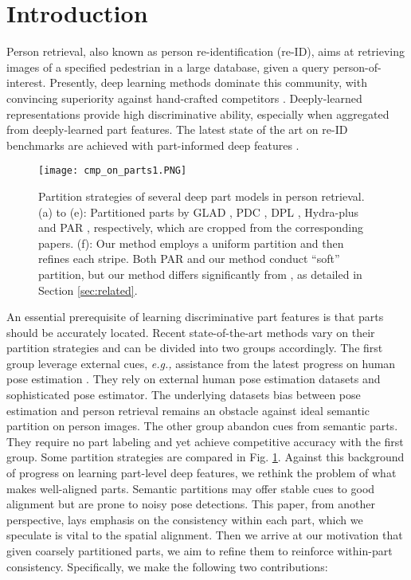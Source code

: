 \documentclass[10pt,twocolumn,letterpaper]{article}
\begin{document}
\section{Introduction}\label{sec:introduction}
Person retrieval, also known as person re-identification (re-ID), aims at retrieving images of a specified pedestrian in a large database, given a query person-of-interest. Presently, deep learning methods dominate this community, with convincing superiority against hand-crafted competitors \cite{DBLP:journals/corr/ZhengYH16}. Deeply-learned representations provide high discriminative ability, especially when aggregated from deeply-learned part features. The latest state of the art on re-ID benchmarks are achieved with part-informed deep features \cite{Yao2017Deep,Su2017Pose,Zhao2017Deeply}.
\begin{figure}[t]
\setlength{\abovecaptionskip}{0cm}  
\setlength{\belowcaptionskip}{-1cm}  
\centering 
\texttt{[image: cmp\_on\_parts1.PNG]}

   \caption{Partition strategies of several deep part models in person retrieval. (a) to (e): Partitioned parts by GLAD \cite{Wei2017GLAD}, PDC \cite{Su2017Pose}, DPL \cite{Yao2017Deep}, Hydra-plus \cite{Liu2017HydraPlus} and PAR \cite{Zhao2017Deeply}, respectively, which are cropped from the corresponding papers. (f): Our method employs a uniform partition and then refines each stripe. Both PAR \cite{Zhao2017Deeply} and our method conduct ``soft'' partition, but our method differs significantly from \cite{Zhao2017Deeply}, as detailed in Section \ref{sec:related}.}
\label{fig:part_cmp}
\end{figure}


An essential prerequisite of learning discriminative part features is that parts should be accurately located. Recent state-of-the-art methods vary on their partition strategies and can be divided into two groups accordingly. The first group \cite {DBLP:journals/corr/ZhengHLY17,Su2017Pose,Wei2017GLAD} leverage external cues, \emph{e.g.,} assistance from the latest progress  on human pose estimation \cite{pose:Long2015Fully,pose:CPM,pose:DeeperCut,pose:hourglass,pose:Cao2016Realtime}. They rely on external human pose estimation datasets and sophisticated pose estimator. The underlying datasets bias between pose estimation and person retrieval remains an obstacle against ideal semantic partition on person images. The other group \cite{Yao2017Deep,Zhao2017Deeply,Liu2017HydraPlus} abandon cues from semantic parts. They require no part labeling and yet achieve competitive accuracy with the first group. Some partition strategies are compared in Fig. \ref{fig:part_cmp}.
Against this background of progress on learning part-level deep features, we rethink the problem of what makes well-aligned parts. Semantic partitions may offer stable cues to good alignment but are prone to noisy pose detections. This paper, from another perspective, lays emphasis on the consistency within each part, which we speculate is vital to the spatial alignment. Then we arrive at our motivation that given coarsely partitioned parts, we aim to refine them to reinforce within-part consistency. Specifically, we make the following two contributions:
\end{document}
